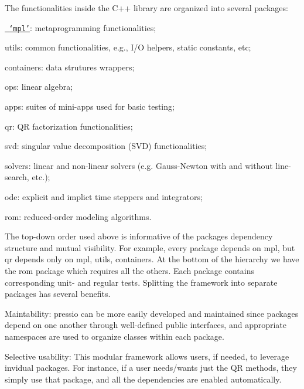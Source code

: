 The functionalities inside the C++ library are organized into several packages\+:


\begin{DoxyItemize}
\item \href{https://github.com/Pressio/pressio/tree/master/packages/mpl/src}{\texttt{ `mpl'}}\+: metaprogramming functionalities;
\item {\ttfamily utils}\+: common functionalities, e.\+g., I/O helpers, static constants, etc;
\item {\ttfamily containers}\+: data strutures wrappers;
\item {\ttfamily ops}\+: linear algebra;
\item {\ttfamily apps}\+: suites of mini-\/apps used for basic testing;
\item {\ttfamily qr}\+: QR factorization functionalities;
\item {\ttfamily svd}\+: singular value decomposition (S\+VD) functionalities;
\item {\ttfamily solvers}\+: linear and non-\/linear solvers (e.\+g. Gauss-\/\+Newton with and without line-\/search, etc.);
\item {\ttfamily ode}\+: explicit and implict time steppers and integrators;
\item {\ttfamily rom}\+: reduced-\/order modeling algorithms.
\end{DoxyItemize}

The top-\/down order used above is informative of the packages\textquotesingle{} dependency structure and mutual visibility. For example, every package depends on {\ttfamily mpl}, but {\ttfamily qr} depends only on {\ttfamily mpl}, {\ttfamily utils}, {\ttfamily containers}. At the bottom of the hierarchy we have the {\ttfamily rom} package which requires all the others. Each package contains corresponding unit-\/ and regular tests. Splitting the framework into separate packages has several benefits.
\begin{DoxyItemize}
\item Maintability\+: {\ttfamily pressio} can be more easily developed and maintained since packages depend on one another through well-\/defined public interfaces, and appropriate namespaces are used to organize classes within each package.
\item Selective usability\+: This modular framework allows users, if needed, to leverage invidual packages. For instance, if a user needs/wants just the QR methods, they simply use that package, and all the dependencies are enabled automatically. 
\end{DoxyItemize}